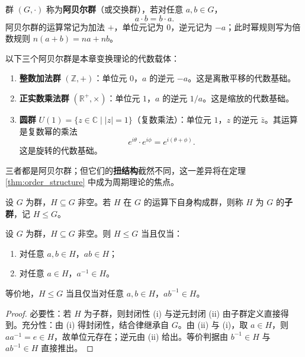 \begin{definition}[阿贝尔群]\label{def:abelian_group}
群 $(G,\cdot)$ 称为\textbf{阿贝尔群}（或交换群），若对任意 $a,b\in G$，
\[
a\cdot b=b\cdot a.
\]
阿贝尔群的运算常记为加法 $+$，单位元记为 $0$，逆元记为 $-a$；此时幂规则写为倍数规则 $n(a+b)=na+nb$。
\end{definition}

\begin{example}[三个基本阿贝尔群]\label{ex:three_abelian_groups}
以下三个阿贝尔群是本章变换理论的代数载体：
\begin{enumerate}[label=(\roman*)]
    \item \textbf{整数加法群} $(\mathbb{Z},+)$：单位元 $0$，$a$ 的逆元 $-a$。这是离散平移的代数基础。
    \item \textbf{正实数乘法群} $(\mathbb{R}^+,\times)$：单位元 $1$，$a$ 的逆元 $1/a$。这是缩放的代数基础。
    \item \textbf{圆群} $U(1)=\{z\in\mathbb{C}\mid |z|=1\}$（复数乘法）：单位元 $1$，$z$ 的逆元 $\bar z$。其运算是复数幂的乘法
    \[
    e^{i\theta}\cdot e^{i\phi}=e^{i(\theta+\phi)}.
    \]
    这是旋转的代数基础。
\end{enumerate}
三者都是阿贝尔群；但它们的\textbf{扭结构}截然不同，这一差异将在定理 \ref{thm:order_structure} 中成为周期理论的焦点。
\end{example}

\begin{definition}[子群]\label{def:subgroup}
设 $G$ 为群，$H\subseteq G$ 非空。若 $H$ 在 $G$ 的运算下自身构成群，则称 $H$ 为 $G$ 的\textbf{子群}，记 $H\le G$。
\end{definition}

\begin{proposition}[子群判据]\label{prop:subgroup_criterion}
设 $G$ 为群，$H\subseteq G$ 非空。则 $H\le G$ 当且仅当：
\begin{enumerate}[label=(\roman*)]
    \item 对任意 $a,b\in H$，$ab\in H$；
    \item 对任意 $a\in H$，$a^{-1}\in H$。
\end{enumerate}
等价地，$H\le G$ 当且仅当对任意 $a,b\in H$，$ab^{-1}\in H$。
\end{proposition}

\begin{proof}
必要性：若 $H$ 为子群，则封闭性 (i) 与逆元封闭 (ii) 由子群定义直接得到。充分性：由 (i) 得封闭性，结合律继承自 $G$。由 (ii) 与 (i)，取 $a\in H$，则 $aa^{-1}=e\in H$，故单位元存在；逆元由 (ii) 给出。等价判据由 $b^{-1}\in H$ 与 $ab^{-1}\in H$ 直接推出。
\end{proof}


